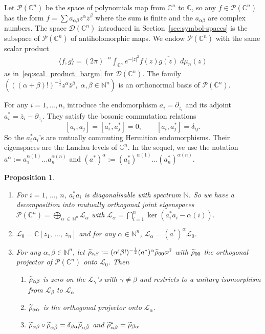 \documentclass[10pt,a4paper]{article}
\newtheorem{prop}[theo]{Proposition}
\theoremstyle{definition}
\numberwithin{equation}{section}
\newcommand{\N}{{\mathbb{N}}}
\newcommand{\C}{{\mathbb{C}}}
\newcommand{\be}{{\beta}}
\newcommand{\al}{{\alpha}}
\newcommand{\ga}{{\gamma}}
\newcommand{\con}{\overline}
\newcommand{\op}{\operatorname}
\newcommand{\D}{\mathcal{D}}
\newcommand{\lag}{\mathcal{L}}
\newcommand{\pol}{\mathcal{P}}
\newcommand{\Vvv}{\tilde \rho}
\let\oldtilde\tilde
\renewcommand*{\tilde}[1]{\mathchoice{\widetilde{#1}}{\widetilde{#1}}{\oldtilde{#1}}{\oldtilde{#1}}}
\begin{document}
Let $\pol (\C^n)$ be the space of polynomials map from $\C^n$ to $\C$, so any $f
\in \pol (\C^n)$ has the form $ f = \sum a_{\al \be} z^ \al \con{z}^\be$ where the sum is finite and the $a_{\al \be}$ are complex numbers. The space $\D (\C^n)$ introduced in Section~\ref{sec:symbol-spaces} is the subspace of $\pol (\C^n)$ of antiholomorphic maps. We endow $\pol (
\C^n)$ with the same scalar product
\begin{gather}\label{eq:scal_prod_2}
\langle f, g \rangle = (2\pi)^{-n} \int_{\C^n} e^{-|z|^2} f (z) \con{g (z)} \; d \mu_n (z)
\end{gather}
as in~\eqref{eq:scal_product_bargm} for $\D (
\C^n)$. The family $(((\al + \be)!)^{-\frac{1}{2}} z^{\al} \con{z}^\be, \;
\al, \be \in \N^n)$ is an orthonormal basis of $\pol (\C^n)$.

For any $i =1, \ldots, n $, introduce the endomorphism $a_i = \partial_{\con{z}_i}$ and its adjoint $a_i^{*} = \con{z}_i - \partial_{z_i}$. They satisfy the bosonic commutation relations
\[
\left[a_i,a_j\right] = \left[a_i^{*}, a_j^{*}\right] = 0, \qquad \left[a_i, a_j^{*}\right] =
\delta_{ij}.
\]
So the $a_i^{*} a_i$'s are mutually commuting Hermitian endomorphisms. Their eigenspaces are the Landau levels of $\C^n$. In the sequel, we use the notation $a^\al := a_1^{\al(1)} \ldots a_n^{\al (n)}$ and $(a^{*})^{\al} := (a_1^*)^{\al(1)} \ldots (a_n^*)^{\al (n)}$.

\begin{prop}\label{prop:linearlandau}\leavevmode
\begin{enumerate}
\item\label{prop4.1.1} For $i=1,\, \ldots,\, n$, $a_i^* a_i$ is diagonalisable with spectrum $\N$. So we have a decomposition into mutually orthogonal joint eigenspaces $ \pol (\C^n) = \bigoplus_{\al\,\in\,\N^n} \lag_\al$ with $\lag_{\al} = \bigcap_{i=1}^{n} \op{ker} (a_i^* a_i - \al (i)).$
\item\label{prop4.1.2} $\lag_0 = \C [z_1,\,\ldots,\,z_n]$ and for any $\al \in \N^n$, $
\lag_{\al} = (a^*)^\al \lag_0 $.
\item\label{prop4.1.3} For any $\al, \be \in \N^n$, let $\Vvv_{\al \be} := (\al ! \be !)^{-\frac{1}{2}} (a^{*})^{\al} \Vvv_{00} a ^{\be}$ with $\Vvv_{00} $ the orthogonal projector of $\pol (\C^n)$ onto $\lag_0$. Then
\begin{enumerate}
\item\label{prop4.1.3.a} $\Vvv_{\al\be}$ is zero on the $\lag_{\ga}$'s with $\ga \neq
\be$ and restricts to a unitary isomorphism from $\lag_{\be}$ to $\lag_{\al}$
\item\label{prop4.1.3.b} $\Vvv_{\al \al}$ is the orthogonal projector onto $\lag_\al$.
\item\label{prop4.1.3.c} $ \Vvv_{\al \be} \circ \Vvv_{\tilde{\al} \tilde{\be}} =
\delta_{\be \tilde{\al}} \Vvv_{\al \tilde \be} $ and $\Vvv_{\al \be} ^{*} = \Vvv_{\be \al} $
\end{enumerate}
\end{enumerate}
\end{prop}
\end{document}

